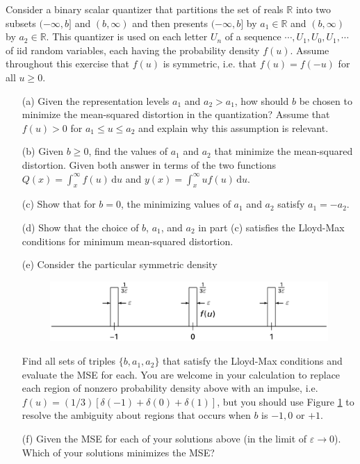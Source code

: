 \documentclass{assignment}
\begin{document}
\begin{prob}[3.3]
    Consider a binary scalar quantizer that partitions the set of reals $\mathbb{R}$ into two subsets $(-\infty,b]$ and $(b,\infty)$ and then presents $(-\infty,b]$ by $a_1\in\mathbb{R}$ and $(b,\infty)$ by $a_2\in\mathbb{R}$. This quantizer is used on each letter $U_n$ of a sequence $\cdots,U_1,U_0,U_1,\cdots$ of iid random variables, each having the probability density $f(u)$. Assume throughout this exercise that $f(u)$ is symmetric, i.e. that $f(u)=f(-u)$ for all $u\geq 0$.
    \begin{itemize}
        \item[(a)] Given the representation levels $a_1$ and $a_2>a_1$, how should $b$ be chosen to minimize the mean-squared distortion in the quantization? Assume that $f(u)>0$ for $a_1\leq u\leq a_2$ and explain why this assumption is relevant.
        \item[(b)] Given $b\geq 0$, find the values of $a_1$ and $a_2$ that minimize the mean-squared distortion. Given both answer in terms of the two functions $Q(x)=\int_x^{\infty}f(u)\,\mathrm{d}u$ and $y(x)=\int_x^{\infty}uf(u)\,\mathrm{d}u$.
        \item[(c)] Show that for $b=0$, the minimizing values of $a_1$ and $a_2$ satisfy $a_1=-a_2$.
        \item[(d)] Show that the choice of $b$, $a_1$, and $a_2$ in part (c) satisfies the Lloyd-Max conditions for minimum mean-squared distortion.
        \item[(e)] Consider the particular symmetric density
        \begin{figure}[H]
            \centering
            \includegraphics[width=.5\columnwidth]{A-9-P-1.png}
            \caption{}
            \label{A-9-P-1}
        \end{figure}
        Find all sets of triples $\{b,a_1,a_2\}$ that satisfy the Lloyd-Max conditions and evaluate the MSE for each. You are welcome in your calculation to replace each region of nonzero probability density above with an impulse, i.e. $f(u)=(1/3)[\delta(-1)+\delta(0)+\delta(1)]$, but you should use Figure \ref{A-9-P-1} to resolve the ambiguity about regions that occurs when $b$ is $-1,0$ or $+1$.
        \item[(f)] Given the MSE for each of your solutions above (in the limit of $\varepsilon\rightarrow 0$). Which of your solutions minimizes the MSE?
    \end{itemize}
\end{prob}
\end{document}
